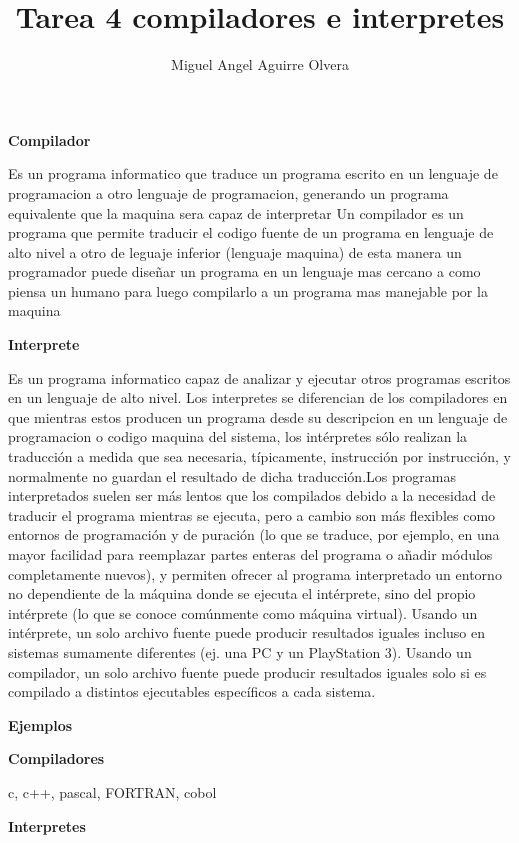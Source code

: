 \documentclass[11pt,a4paper]{article}
\author{Miguel Angel Aguirre Olvera}
\title{Tarea 4 compiladores e interpretes}
\begin{document}
\maketitle
\begin{multicols}{2}
\begin{center}
\textbf{Compilador}
\end{center}
Es un programa informatico que traduce un programa escrito en un lenguaje de programacion a otro lenguaje de programacion, generando un programa equivalente que la maquina sera capaz de interpretar 
Un compilador es un programa que permite traducir el codigo fuente de un programa en lenguaje de alto nivel a otro de leguaje inferior (lenguaje maquina) de esta manera un programador puede diseñar un programa en un lenguaje mas cercano a como piensa un humano para luego compilarlo a un programa mas manejable por la maquina 
\begin{center}
\textbf{Interprete}
\end{center}
Es un programa informatico capaz de analizar y ejecutar otros programas escritos en un lenguaje de alto nivel. Los interpretes se diferencian de los compiladores en que mientras estos producen un programa desde su descripcion en un lenguaje de programacion o codigo maquina del sistema, los intérpretes sólo realizan la traducción a medida que sea necesaria, típicamente, instrucción por instrucción, y normalmente no guardan el resultado de dicha traducción.Los programas interpretados suelen ser más lentos que los compilados debido a la necesidad de traducir el programa mientras se ejecuta, pero a cambio son más flexibles como entornos de programación y de puración (lo que se traduce, por ejemplo, en una mayor facilidad para reemplazar partes enteras del programa o añadir módulos completamente nuevos), y permiten ofrecer al programa interpretado un entorno no dependiente de la máquina donde se ejecuta el intérprete, sino del propio intérprete (lo que se conoce comúnmente como máquina virtual).
Usando un intérprete, un solo archivo fuente puede producir resultados iguales incluso en sistemas sumamente diferentes (ej. una PC y un PlayStation 3). Usando un compilador, un solo archivo fuente puede producir resultados iguales solo si es compilado a distintos ejecutables específicos a cada sistema.
\begin{center}
\textbf{Ejemplos}
\end{center}
\textbf{Compiladores}

c, c++, pascal, FORTRAN, cobol


\textbf{Interpretes}


\end{multicols}
\end{document}
